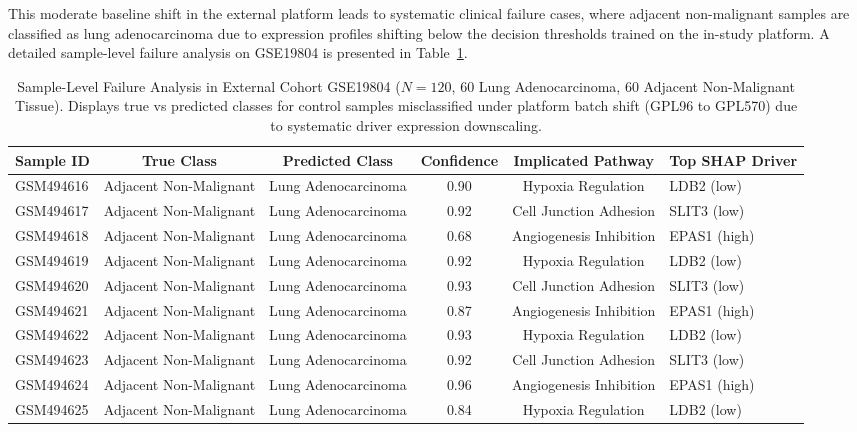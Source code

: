 \documentclass[journal,10pt]{IEEEtran}
\begin{document}
This moderate baseline shift in the external platform leads to systematic clinical failure cases, where adjacent non-malignant samples are classified as lung adenocarcinoma due to expression profiles shifting below the decision thresholds trained on the in-study platform. A detailed sample-level failure analysis on GSE19804 is presented in Table~\ref{tab:failure_analysis}.

\begin{table}[htbp]
\centering
\caption{Sample-Level Failure Analysis in External Cohort GSE19804 ($N=120$, $60$ Lung Adenocarcinoma, $60$ Adjacent Non-Malignant Tissue). Displays true vs predicted classes for control samples misclassified under platform batch shift (GPL96 to GPL570) due to systematic driver expression downscaling.}
\label{tab:failure_analysis}
\begin{tabular}{lccccl}
\toprule
\textbf{Sample ID} & \textbf{True Class} & \textbf{Predicted Class} & \textbf{Confidence} & \textbf{Implicated Pathway} & \textbf{Top SHAP Driver} \\
\midrule
GSM494616 & Adjacent Non-Malignant & Lung Adenocarcinoma & 0.90 & Hypoxia Regulation & LDB2 (low) \\
GSM494617 & Adjacent Non-Malignant & Lung Adenocarcinoma & 0.92 & Cell Junction Adhesion & SLIT3 (low) \\
GSM494618 & Adjacent Non-Malignant & Lung Adenocarcinoma & 0.68 & Angiogenesis Inhibition & EPAS1 (high) \\
GSM494619 & Adjacent Non-Malignant & Lung Adenocarcinoma & 0.92 & Hypoxia Regulation & LDB2 (low) \\
GSM494620 & Adjacent Non-Malignant & Lung Adenocarcinoma & 0.93 & Cell Junction Adhesion & SLIT3 (low) \\
GSM494621 & Adjacent Non-Malignant & Lung Adenocarcinoma & 0.87 & Angiogenesis Inhibition & EPAS1 (high) \\
GSM494622 & Adjacent Non-Malignant & Lung Adenocarcinoma & 0.93 & Hypoxia Regulation & LDB2 (low) \\
GSM494623 & Adjacent Non-Malignant & Lung Adenocarcinoma & 0.92 & Cell Junction Adhesion & SLIT3 (low) \\
GSM494624 & Adjacent Non-Malignant & Lung Adenocarcinoma & 0.96 & Angiogenesis Inhibition & EPAS1 (high) \\
GSM494625 & Adjacent Non-Malignant & Lung Adenocarcinoma & 0.84 & Hypoxia Regulation & LDB2 (low) \\
\bottomrule
\end{tabular}
\end{table}
\end{document}
